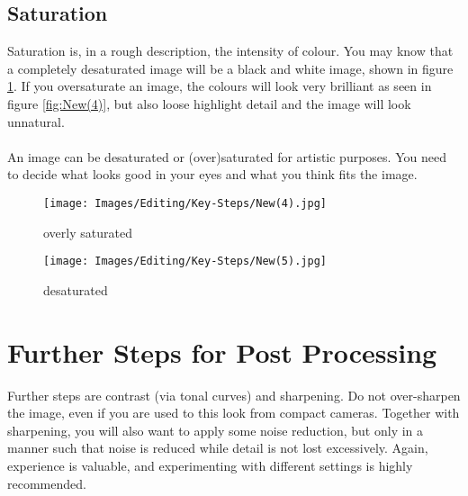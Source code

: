 \subsection{Saturation}

Saturation is, in a rough description, the intensity of colour. You may know that a completely desaturated image will be a black and white image, shown in figure \ref{fig:New(5)}. If you oversaturate an image, the colours will look very brilliant as seen in figure \ref{fig:New(4)}, but also loose highlight detail and the image will look unnatural.
\\
\\
An image can be desaturated or (over)saturated for artistic purposes. You need to decide what looks good in your eyes and what you think fits the image.

\begin{figure}[htbp]
\begin{minipage}{.5\textwidth}
	\centering
		\texttt{[image: Images/Editing/Key-Steps/New(4).jpg]}
	\caption{overly saturated}
	\label{fig:New(4)}
\end{minipage}
\begin{minipage}{.5\textwidth}
	\centering
		\texttt{[image: Images/Editing/Key-Steps/New(5).jpg]}
	\caption{desaturated}
	\label{fig:New(5)}
\end{minipage}
\end{figure}


\section{Further Steps for Post Processing}

Further steps are contrast (via tonal curves) and sharpening. Do not over-sharpen the image, even if you are used to this look from compact cameras. Together with sharpening, you will also want to apply some noise reduction, but only in a manner such that noise is reduced while detail is not lost excessively. Again, experience is valuable, and experimenting with different settings is highly recommended.
